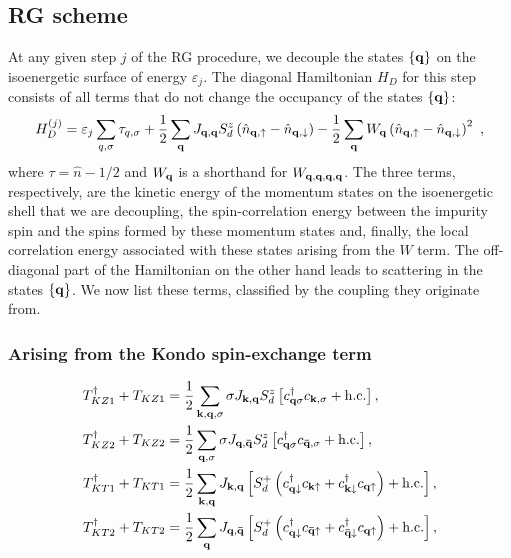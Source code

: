 \documentclass[reprint,hidelinks,onecolumn]{revtex4-2}
\begin{document}
\subsection{RG scheme}
At any given step \(j\) of the RG procedure, we decouple the states \(\left\{ {\bf q} \right\} \) on the isoenergetic surface of energy \(\varepsilon_j\). The diagonal Hamiltonian \(H_D\) for this step consists of all terms that do not change the occupancy of the states \(\left\{{\bf q}\right\}\):
\begin{equation}\begin{aligned}
	H_D^{(j)} = \varepsilon_j\sum_{q,\sigma}\tau_{q,\sigma} + \frac{1}{2}\sum_{{\bf q}}J_{{\bf q}, {\bf q}}S_d^z\left(\hat n_{{\bf q}, \uparrow} - \hat n_{{\bf q}, \downarrow}\right) - \frac{1}{2}\sum_{{\bf q}}W_{\bf q}\left(\hat n_{{\bf q}, \uparrow} - \hat n_{{\bf q}, \downarrow}\right)^2~,
\end{aligned}\end{equation}
where \(\tau = \hat n - 1/2\) and \(W_{{\bf q}}\) is a shorthand for \(W_{{\bf q},{\bf q},{\bf q},{\bf q}}\). The three terms, respectively, are the kinetic energy of the momentum states on the isoenergetic shell that we are decoupling, the spin-correlation energy between the impurity spin and the spins formed by these momentum states and, finally, the local correlation energy associated with these states arising from the \(W\) term. The off-diagonal part of the Hamiltonian on the other hand leads to scattering in the states \(\left\{ {\bf q} \right\} \). We now list these terms, classified by the coupling they originate from.

\subsubsection*{Arising from the Kondo spin-exchange term}
\begin{equation}\begin{aligned}
	T_{KZ1}^\dagger + T_{KZ1} &= \frac{1}{2}\sum_{{\bf k}, {\bf q}, \sigma}\sigma J_{{\bf k}, {\bf q}} S_d^z  \left[c^\dagger_{{\bf q}\sigma}c_{{\bf k},\sigma} + \text{h.c.}\right],\\
	T_{KZ2}^\dagger + T_{KZ2} &= \frac{1}{2}\sum_{{\bf q}, \sigma}\sigma J_{{\bf q}, {\bf \bar q}} S_d^z  \left[c^\dagger_{{\bf q}\sigma}c_{{\bf \bar q},\sigma} + \text{h.c.}\right],\\
	T_{KT1}^\dagger + T_{KT1} &= \frac{1}{2}\sum_{{\bf k}, {\bf q}}J_{{\bf k}, {\bf q}} \left[S_d^+\left(c^\dagger_{{\bf q}\downarrow}c_{{\bf k}\uparrow} + c^\dagger_{{\bf k}\downarrow}c_{{\bf q}\uparrow}\right) + \text{h.c.}\right],\\
	T_{KT2}^\dagger + T_{KT2} &= \frac{1}{2}\sum_{{\bf q}}J_{{\bf q}, {\bf \bar q}} \left[S_d^+\left(c^\dagger_{{\bf q}\downarrow}c_{{\bf \bar q}\uparrow} + c^\dagger_{{\bf \bar q}\downarrow}c_{{\bf q}\uparrow}\right) + \text{h.c.}\right],\\
\end{aligned}\end{equation}
\end{document}

